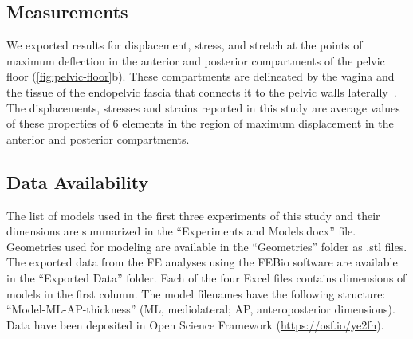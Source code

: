 \documentclass[9pt,twocolumn,twoside]{pnas-new}
\begin{document}
\subsection*{Measurements}
We exported results for displacement, stress, and stretch at the points of maximum deflection in the anterior and posterior compartments of the pelvic floor (\cref{fig:pelvic-floor}b). These compartments are delineated by the vagina and the tissue of the endopelvic fascia that connects it to the pelvic walls laterally~\cite{Maas2012-rm}. The displacements, stresses and strains reported in this study are average values of these properties of 6 elements in the region of maximum displacement in the anterior and posterior compartments.

\subsection*{Data Availability} The list of models used in the first three experiments of this study and their dimensions are summarized in the ``Experiments and Models.docx” file. Geometries used for modeling are available in the ``Geometries” folder as .stl files. The exported data from the FE analyses using the FEBio software are available in the ``Exported Data” folder. Each of the four Excel files contains dimensions of models in the first column. The model filenames have the following structure: ``Model-ML-AP-thickness” (ML, mediolateral; AP, anteroposterior dimensions). Data have been deposited in Open Science Framework (\url{https://osf.io/ye2fh}).


\showacknow{} %


\end{document}
